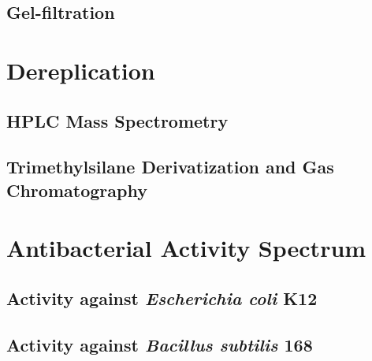     
    \subsection{Gel-filtration} %
    \label{sub:results_gel_filtration}


\section{Dereplication} %
\label{sec:dereplication}

    \subsection{HPLC Mass Spectrometry} %
    \label{sub:hplc_mass_spectrometry}


    \subsection{Trimethylsilane Derivatization and Gas Chromatography} %
    \label{sub:trimethylsilane_derivatization_and_gas_chromatography_results}

    


\section{Antibacterial Activity Spectrum} %
\label{sec:antibacterial_activity_spectrum}


    \subsection{Activity against \textit{Escherichia coli} K12} %
    \label{sub:activity_against_e_coli}


    \subsection{Activity against \textit{Bacillus subtilis} 168} %
    \label{sub:activity_against_b_subtilis}

